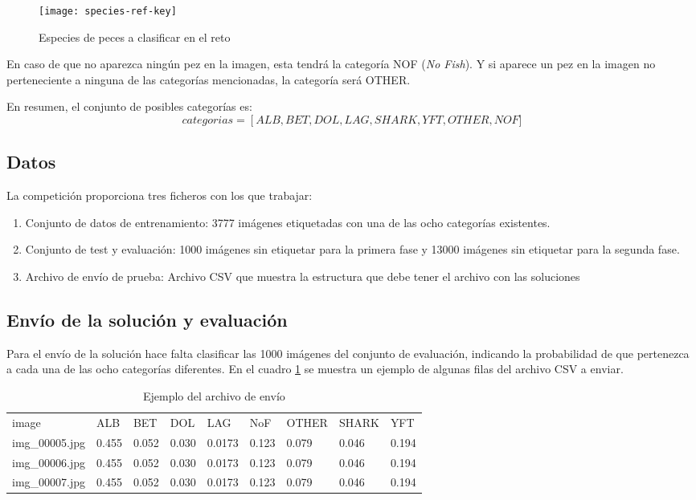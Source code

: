 \begin{figure}
  \centering
  \caption{Especies de peces a clasificar en el reto}
\label{kaggle-fishes}
  \texttt{[image: species-ref-key]}
\end{figure}

En caso de que no aparezca ningún pez en la imagen, esta tendrá la categoría NOF (\textit{No Fish}). Y si aparece un pez en la imagen no perteneciente a ninguna de las categorías mencionadas, la categoría será OTHER.

En resumen, el conjunto de posibles categorías es:
\[
  categorias =
  \left[ALB, BET, DOL, LAG, SHARK, YFT, OTHER, NOF]
\]

\subsection{Datos}

La competición proporciona tres ficheros con los que trabajar:

\begin{enumerate}
  \item{Conjunto de datos de entrenamiento: 3777 imágenes etiquetadas con una de las ocho categorías existentes.}
  \item{Conjunto de test y evaluación: 1000 imágenes sin etiquetar para la primera fase y 13000 imágenes sin etiquetar para la segunda fase.}
  \item{Archivo de envío de prueba: Archivo CSV que muestra la estructura que debe tener el archivo con las soluciones}
\end{enumerate}

\subsection{Envío de la solución y evaluación}
\label{sec:envio-y-eval}

Para el envío de la solución hace falta clasificar las 1000 imágenes del conjunto de evaluación, indicando la probabilidad de que pertenezca a cada una de las ocho categorías diferentes. En el cuadro \ref{submission-sample} se muestra un ejemplo de algunas filas del archivo CSV a enviar.

\begin{table}[]
\centering
\caption{Ejemplo del archivo de envío}
\label{submission-sample}
\begin{tabular}{lllllllll}
image          & ALB   & BET   & DOL   & LAG    & NoF   & OTHER & SHARK  & YFT  \\
img\_00005.jpg & 0.455 & 0.052 & 0.030 & 0.0173 & 0.123 & 0.079 & 0.046 & 0.194\\
img\_00006.jpg & 0.455 & 0.052 & 0.030 & 0.0173 & 0.123 & 0.079 & 0.046 & 0.194\\
img\_00007.jpg & 0.455 & 0.052 & 0.030 & 0.0173 & 0.123 & 0.079 & 0.046 & 0.194\\
\end{tabular}
\end{table}

